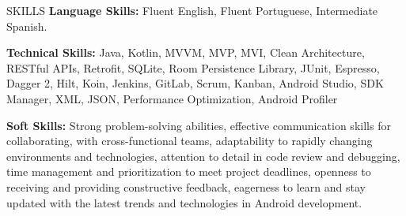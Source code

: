 \begin{rSection}{SKILLS}
    {\bf Language Skills:} Fluent English, Fluent Portuguese, Intermediate Spanish.

    {\bf Technical Skills:} Java, Kotlin, MVVM, MVP, MVI, Clean Architecture, RESTful APIs, Retrofit, 
    SQLite, Room Persistence Library, JUnit, Espresso, Dagger 2, Hilt, Koin, Jenkins, GitLab,
    Scrum, Kanban, Android Studio, SDK Manager, XML, JSON, Performance Optimization, Android Profiler

    {\bf Soft Skills:} Strong problem-solving abilities, effective communication skills for collaborating, 
    with cross-functional teams, adaptability to rapidly changing environments and technologies,
    attention to detail in code review and debugging, time management and prioritization to meet project 
    deadlines, openness to receiving and providing constructive feedback, eagerness to learn and stay 
    updated with the latest trends and technologies in Android development.
\end{rSection}